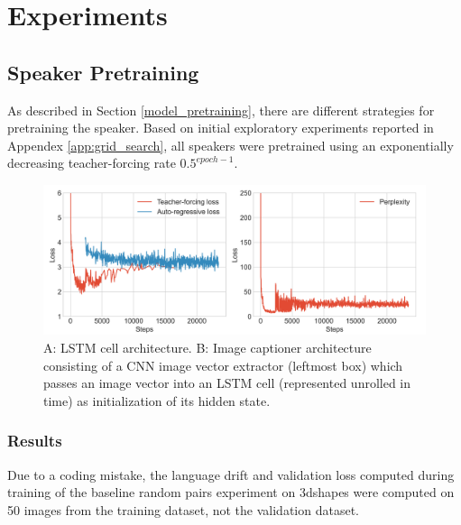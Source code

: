 \section{Experiments}


\subsection{Speaker Pretraining}
As described in Section \ref{model_pretraining}, there are different strategies for pretraining the speaker. Based on initial exploratory experiments reported in Appendex \ref{app:grid_search}, all speakers were pretrained using an exponentially decreasing teacher-forcing rate $0.5^{epoch-1}$.

\begin{figure}
	\centering
	\includegraphics[width=\linewidth]{images/coco_pretraining_losses_ppls.png}
	\caption{A: LSTM cell architecture. B: Image captioner architecture consisting of a CNN image vector extractor (leftmost box) which passes an image vector into an LSTM cell (represented unrolled in time) as initialization of its hidden state.}
	\label{fig:coco_pretraining}
\end{figure}  


\subsubsection{Results}
Due to a coding mistake, the language drift and validation loss computed during training of the baseline random pairs experiment on 3dshapes were computed on 50 images from the training dataset, not the validation dataset.



